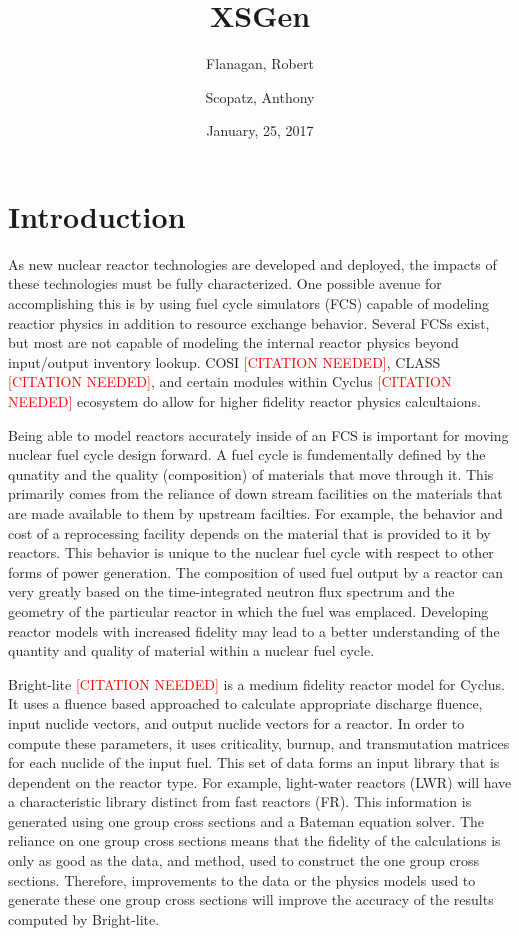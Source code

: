 \documentclass{article}
\newcommand{\citeme}{\textcolor{red}{[CITATION NEEDED]}\xspace}
\begin{document}
\title{XSGen}
\date{January, 25, 2017}
\author{Flanagan, Robert \and Scopatz, Anthony}
\maketitle
\doublespacing

\section{Introduction}
As new nuclear reactor technologies are developed and deployed,
the impacts of these technologies must be fully characterized. One possible
avenue for accomplishing this is by using fuel cycle simulators (FCS) capable of
modeling reactior physics in addition to resource exchange behavior.
Several FCSs exist, but most are not capable of modeling the internal reactor physics
beyond input/output inventory lookup.
COSI \citeme, CLASS \citeme, and certain modules within Cyclus \citeme
ecosystem do allow for higher fidelity reactor physics calcultaions.

Being able to model reactors accurately inside of an FCS is important for moving
nuclear fuel cycle design forward. A fuel cycle is fundementally defined by the
qunatity and the quality (composition) of materials that move through it.
This primarily comes from the reliance of down stream facilities on the materials
that are made available to them by upstream facilties.
For example, the behavior and cost of a reprocessing facility depends on the
material that is provided to it by reactors. This behavior is unique to the nuclear fuel
cycle with respect to other forms of power generation. The
composition of used fuel output by a reactor can very greatly based on the
time-integrated neutron flux spectrum and the geometry of the particular reactor
in which the fuel was emplaced. Developing reactor models with increased fidelity
may lead to a better understanding of the quantity and quality of material within
a nuclear fuel cycle.

Bright-lite \citeme is a medium fidelity reactor model for Cyclus. It uses a fluence
based approached to calculate appropriate discharge fluence, input nuclide vectors,
and output nuclide vectors for a reactor. In order to compute these parameters, it
uses criticality, burnup, and transmutation matrices for each nuclide of the input
fuel. This set of data forms an input library that is dependent on the reactor type.
For example, light-water reactors (LWR) will have a characteristic library distinct from
fast reactors (FR). This information is generated using one group cross sections and
a Bateman equation solver. The reliance on one group cross sections means that the
fidelity of the calculations is only as good as the data, and method, used to construct
the one group cross sections. Therefore, improvements to the data or the physics models used to
generate these one group cross sections will improve the accuracy of the results
computed by Bright-lite.
\end{document}
